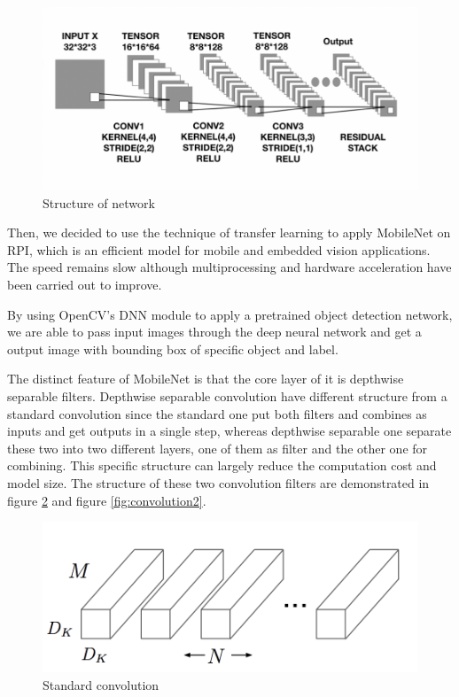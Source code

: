 \documentclass[11pt, titlepage]{article} %
\begin{document}
\begin{figure}[]
	\centering
   	\includegraphics[scale=0.6]{network.png}
   	\caption{Structure of network}
   	\label{fig:network}
\end{figure}

Then, we decided to use the technique of transfer learning to apply MobileNet on RPI, which is an efficient model for mobile and embedded vision applications. The speed remains slow although multiprocessing and hardware acceleration have been carried out to improve.

By using OpenCV’s DNN module to apply a pretrained object detection network, we are able to pass input images through the deep neural network and get a output image with bounding box of specific object and label.

The distinct feature of MobileNet is that the core layer of it is depthwise separable filters. Depthwise separable convolution have different structure from a standard convolution since the standard one put both filters and combines as inputs and get outputs in a single step, whereas depthwise separable one separate these two into two different layers, one of them as filter and the other one for combining. This specific structure can largely reduce the computation cost and model size. The structure of these two convolution filters are demonstrated in figure \ref{fig:convolution1} and figure \ref{fig:convolution2}.

\begin{figure}[]
	\centering
   	\includegraphics[scale=0.5]{convolution1.png}
   	\caption{Standard convolution}
   	\label{fig:convolution1}
\end{figure}
\end{document}
